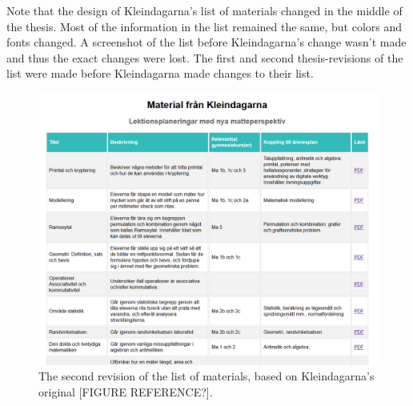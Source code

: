 Note that the design of Kleindagarna's list of materials changed in the middle of the thesis. Most of the information in the list remained the same, but colors and fonts changed. A screenshot of the list before Kleindagarna's change wasn't made and thus the exact changes were lost. The first and second thesis-revisions of the list were made before Kleindagarna made changes to their list.

\begin{figure}[H]
\centering
\includegraphics[width=\linewidth]{figure/screenshot_materiallista_revision_2.png}
\caption{The second revision of the list of materials, based on Kleindagarna's original [FIGURE REFERENCE?].}
\end{figure}

